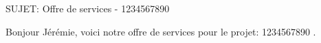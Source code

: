 SUJET: Offre de services - 1234567890 \par Bonjour Jérémie, voici notre offre de services pour le projet: 1234567890 .